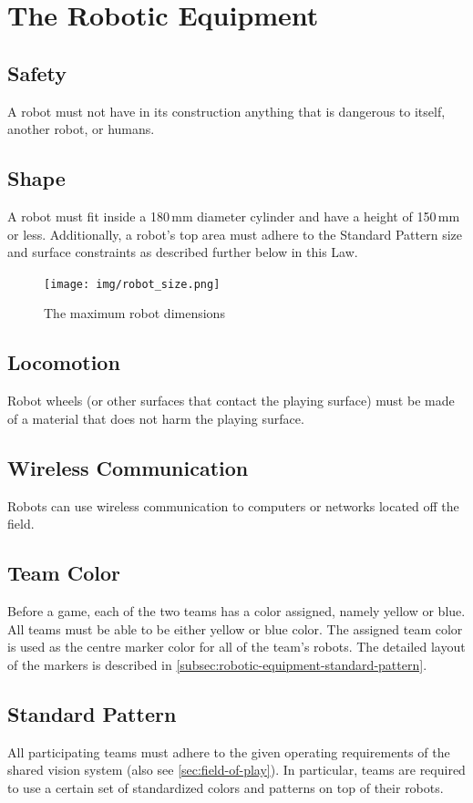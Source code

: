 \section{The Robotic Equipment}\label{sec:robotic-equipment}

\subsection{Safety}
A robot must not have in its construction anything that is dangerous to itself, another robot, or humans.

\subsection{Shape}
A robot must fit inside a 180\,mm diameter cylinder and have a height of 150\,mm or less.
Additionally, a robot's top area must adhere to the Standard Pattern size and surface constraints as described further below in this Law.

\begin{figure}[ht] %
	\centering
	\texttt{[image: img/robot\_size.png]}
	\caption{The maximum robot dimensions}
	\label{fig:robotdimension}
\end{figure}

\subsection{Locomotion}
Robot wheels (or other surfaces that contact the playing surface) must be made of a material that does not harm the playing surface.

\subsection{Wireless Communication}
Robots can use wireless communication to computers or networks located off the field.

\subsection{Team Color}
Before a game, each of the two teams has a color assigned, namely yellow or blue.
All teams must be able to be either yellow or blue color.
The assigned team color is used as the centre marker color for all of the team's robots.
The detailed layout of the markers is described in \autoref{subsec:robotic-equipment-standard-pattern}.

\subsection{Standard Pattern}\label{subsec:robotic-equipment-standard-pattern}
All participating teams must adhere to the given operating requirements of the shared vision system (also see \autoref{sec:field-of-play}).
In particular, teams are required to use a certain set of standardized colors and patterns on top of their robots.


